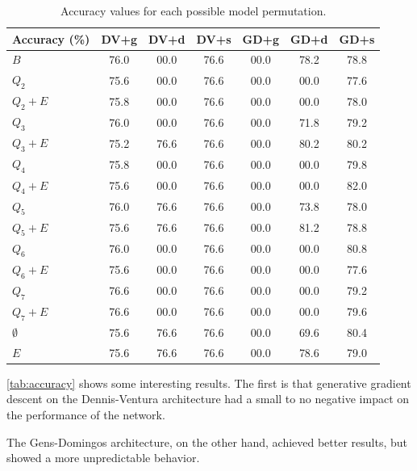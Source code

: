 \begin{table}[h]
  \centering
  \begin{tabular}{l|c|c|c|c|c|c}
    \hline
    \multicolumn{1}{c}{\bfseries Accuracy (\%)} & \multicolumn{1}{c}{\bfseries DV+g} &
    \multicolumn{1}{c}{\bfseries DV+d} & \multicolumn{1}{c}{\bfseries DV+s} &
    \multicolumn{1}{c}{\bfseries GD+g} & \multicolumn{1}{c}{\bfseries GD+d} &
    \multicolumn{1}{c}{\bfseries GD+s}\\
    \hline
    $B$         & 76.0 & 00.0 & 76.6 & 00.0 & 78.2 & 78.8\\
    $Q_2$       & 75.6 & 00.0 & 76.6 & 00.0 & 00.0 & 77.6\\
    $Q_2+E$     & 75.8 & 00.0 & 76.6 & 00.0 & 00.0 & 78.0\\
    $Q_3$       & 76.0 & 00.0 & 76.6 & 00.0 & 71.8 & 79.2\\
    $Q_3+E$     & 75.2 & 76.6 & 76.6 & 00.0 & 80.2 & 80.2\\
    $Q_4$       & 75.8 & 00.0 & 76.6 & 00.0 & 00.0 & 79.8\\
    $Q_4+E$     & 75.6 & 00.0 & 76.6 & 00.0 & 00.0 & 82.0\\
    $Q_5$       & 76.0 & 76.6 & 76.6 & 00.0 & 73.8 & 78.0\\
    $Q_5+E$     & 75.6 & 76.6 & 76.6 & 00.0 & 81.2 & 78.8\\
    $Q_6$       & 76.0 & 00.0 & 76.6 & 00.0 & 00.0 & 80.8\\
    $Q_6+E$     & 75.6 & 00.0 & 76.6 & 00.0 & 00.0 & 77.6\\
    $Q_7$       & 76.6 & 00.0 & 76.6 & 00.0 & 00.0 & 79.2\\
    $Q_7+E$     & 76.6 & 00.0 & 76.6 & 00.0 & 00.0 & 79.6\\
    $\emptyset$ & 75.6 & 76.6 & 76.6 & 00.0 & 69.6 & 80.4\\
    $E$         & 75.6 & 76.6 & 76.6 & 00.0 & 78.6 & 79.0\\
  \end{tabular}
  \caption{Accuracy values for each possible model permutation.\label{tab:accuracy}}
\end{table}

\autoref{tab:accuracy} shows some interesting results. The first is that generative gradient
descent on the Dennis-Ventura architecture had a small to no negative impact on the performance of
the network.

The Gens-Domingos architecture, on the other hand, achieved better results, but showed a more
unpredictable behavior.

